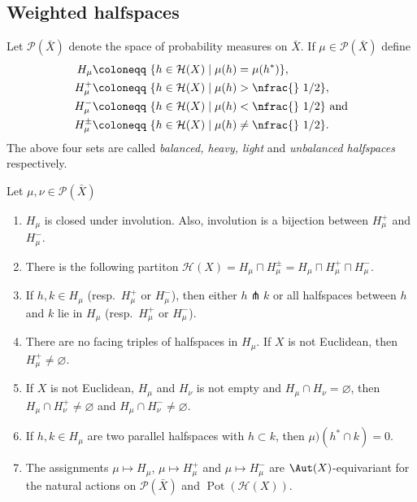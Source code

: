 \subsection{Weighted halfspaces}
\label{sec:weight}

\begin{defin}
  Let \(\mathcal{P}(\bar X)\) denote the space of probability measures on \(\bar X\). If \(\mu \in \mathcal{P}(\bar X)\) define
  \begin{align*}
    H_\mu \coloneqq &\ \{h \in \mathcal{H}(X) \mid \mu(h) = \mu(h^\ast)\},\\
    H_\mu^+ \coloneqq &\ \{h \in \mathcal{H}(X) \mid \mu(h) > \text{\nfrac{} 1/2} \},\\
    H_\mu^- \coloneqq &\ \{h \in \mathcal{H}(X) \mid \mu(h) < \text{\nfrac{} 1/2}\} \text{ and}\\
    H_\mu^\pm \coloneqq &\ \{h \in \mathcal{H}(X) \mid \mu(h) \neq \text{\nfrac{} 1/2}\}.
  \end{align*}
  The above four sets are called \emph{balanced, heavy, light} and \emph{unbalanced halfspaces} respectively.
\end{defin}

\begin{lemma}[{\cite[Lem. 4.6]{MR3509968}}]
  Let \(\mu,\nu \in \mathcal{P}(\bar X)\)
  \begin{enumerate}
  \item \(H_\mu\) is closed under involution. Also, involution is a bijection between \(H_\mu^+\) and \(H_\mu^-\).
  \item There is the following partiton \(\mathcal{H}(X) = H_\mu \sqcap H_\mu^\pm = H_\mu \sqcap H_\mu^+ \sqcap H_\mu^-\).
  \item If \(h, k \in H_\mu\) (resp.\ \(H_\mu^+\) or \(H_\mu^-\)), then either \(h \pitchfork k\) or all halfspaces between \(h\) and \(k\) lie in \(H_\mu\) (resp.\ \(H_\mu^+\) or \(H_\mu^-\)).
  \item There are no facing triples of halfspaces in \(H_\mu\). If \(X\) is not Euclidean, then \(H_\mu^+ \neq \varnothing\).
  \item If \(X\) is not Euclidean, \(H_\mu\) and \(H_\nu\) is not empty and \(H_\mu \cap H_\nu = \varnothing\), then \(H_\mu \cap H_\nu^+ \neq \varnothing\) and \(H_\mu \cap H_\nu^- \neq \varnothing\).
  \item If \(h, k  \in H_\mu\) are two parallel halfspaces with \(h \subset k\), then \(\mu)(h^\ast \cap k) = 0\).
  \item The assignments \(\mu \mapsto H_\mu\), \(\mu \mapsto H_\mu^+\) and \(\mu \mapsto H_\mu^-\) are \(\Aut(X)\)-equivariant for the natural actions on \(\mathcal{P}(\bar X)\) and \(\operatorname{Pot}(\mathcal{H}(X))\).
  \end{enumerate}
\end{lemma}

